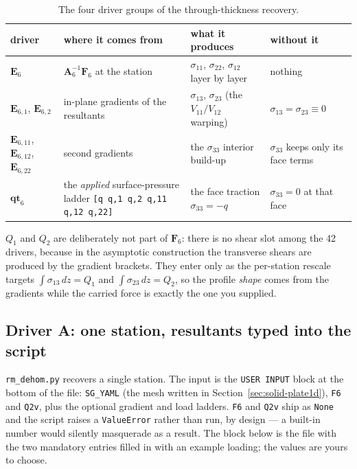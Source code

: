 \begin{table}[htbp]
\centering
\footnotesize
\begin{tabular}{p{2.6cm}p{3.6cm}p{4.2cm}p{3.0cm}}
\toprule
driver & where it comes from & what it produces & without it \\
\midrule
$\mathbf{E}_6$ & $\mathbf{A}_6^{-1}\mathbf{F}_6$ at the station
  & $\sigma_{11}$, $\sigma_{22}$, $\sigma_{12}$ layer by layer & nothing \\
$\mathbf{E}_{6,1}$, $\mathbf{E}_{6,2}$ & in-plane gradients of the resultants
  & $\sigma_{13}$, $\sigma_{23}$ (the $V_{11}/V_{12}$ warping)
  & $\sigma_{13}=\sigma_{23}\equiv0$ \\
$\mathbf{E}_{6,11}$, $\mathbf{E}_{6,12}$, $\mathbf{E}_{6,22}$ & second gradients
  & the $\sigma_{33}$ interior build-up
  & $\sigma_{33}$ keeps only its face terms \\
$\mathbf{qt}_6$ & the \emph{applied} surface-pressure ladder
  \texttt{[q q,1 q,2 q,11 q,12 q,22]}
  & the face traction $\sigma_{33} = -q$ & $\sigma_{33}=0$ at that face \\
\bottomrule
\end{tabular}
\caption{The four driver groups of the through-thickness recovery.}
\label{tab:solid-drivers}
\end{table}

$Q_1$ and $Q_2$ are deliberately not part of $\mathbf{F}_6$: there is no shear
slot among the 42 drivers, because in the asymptotic construction the transverse
shears are produced by the gradient brackets. They enter only as the per-station
rescale targets $\int\sigma_{13}\,dz = Q_1$ and $\int\sigma_{23}\,dz = Q_2$, so
the profile \emph{shape} comes from the gradients while the carried force is
exactly the one you supplied.

\subsection{Driver A: one station, resultants typed into the script}

\texttt{rm\_dehom.py} recovers a single station. The input is the
\texttt{USER INPUT} block at the bottom of the file: \texttt{SG\_YAML} (the mesh
written in Section~\ref{sec:solid-plate1d}), \texttt{F6} and \texttt{Q2v}, plus
the optional gradient and load ladders. \texttt{F6} and \texttt{Q2v} ship as
\texttt{None} and the script raises a \texttt{ValueError} rather than run, by
design --- a built-in number would silently masquerade as a result. The block
below is the file with the two mandatory entries filled in with an example
loading; the values are yours to choose.

